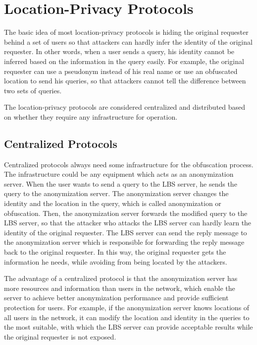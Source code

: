 \section{ Location-Privacy Protocols}

\noindent The basic idea of most location-privacy protocols is hiding the original requester behind a set of users so that attackers can hardly infer the identity of the original requester. In other words, when a user sends a query, his identity cannot be inferred based on the information in the query easily. For example, the original requester can use a pseudonym instead of his real name or use an obfuscated location to send his queries, so that attackers cannot tell the difference between two sets of queries. 

The location-privacy protocols are considered centralized and distributed based on whether they require any infrastructure for operation. 


\subsection{ Centralized Protocols}

\noindent Centralized protocols always need some infrastructure for the obfuscation process. The infrastructure could be any equipment which acts as an anonymization server. When the user wants to send a query to the LBS server, he sends the query to the anonymization server. The anonymization server changes the identity and the location in the query, which is called anonymization or obfuscation. Then, the anonymization server forwards the modified query to the LBS server, so that the attacker who attacks the LBS server can hardly learn the identity of the original requester. The LBS server can send the reply message to the anonymization server which is responsible for forwarding the reply message back to the original requester. In this way, the original requester gets the information he needs, while avoiding from being located by the attackers.

The advantage of a centralized protocol is that the anonymization server has more resources and information than users in the network, which enable the server to achieve better anonymization performance and provide sufficient protection for users. For example, if the anonymization server knows locations of all users in the network, it can modify the location and identity in the queries to the most suitable, with which the LBS server can provide acceptable results while the original requester is not exposed.

